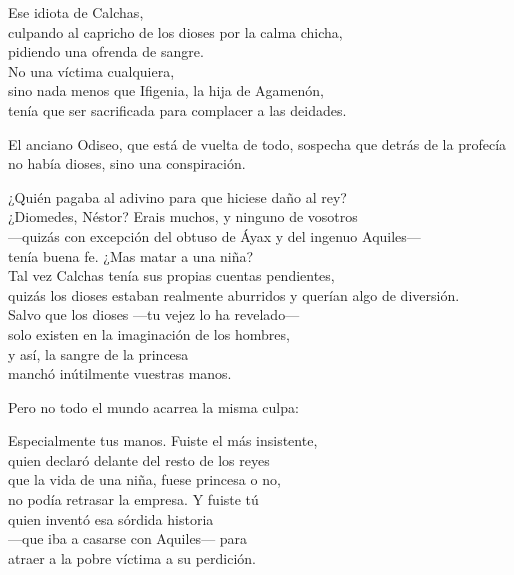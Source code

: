 \begin{versopropio}
Ese idiota de Calchas,\\
culpando al capricho de los dioses por la calma chicha,\\
pidiendo una ofrenda de sangre.\\
No una víctima cualquiera,\\
sino nada menos que Ifigenia, la hija de Agamenón,\\
tenía que ser sacrificada para complacer a las deidades.
\end{versopropio}

El anciano Odiseo, que está de vuelta de todo, sospecha que detrás de la profecía no había dioses, sino una conspiración.

\begin{versopropio}
¿Quién pagaba al adivino para que hiciese daño al rey?\\
¿Diomedes, Néstor? Erais muchos, y ninguno de vosotros\\
---quizás con excepción del obtuso de Áyax y del ingenuo Aquiles---\\
tenía buena fe. ¿Mas matar a una niña?\\
Tal vez Calchas tenía sus propias cuentas pendientes,\\
quizás los dioses estaban realmente aburridos y querían algo de diversión.\\
Salvo que los dioses ---tu vejez lo ha revelado---\\
solo existen en la imaginación de los hombres,\\
y así, la sangre de la princesa\\
manchó inútilmente vuestras manos.
\end{versopropio}

Pero no todo el mundo acarrea la misma culpa:

\begin{versopropio}
Especialmente tus manos. Fuiste el más insistente,\\
quien declaró delante del resto de los reyes\\
que la vida de una niña, fuese princesa o no,\\
no podía retrasar la empresa. Y fuiste tú\\
quien inventó esa sórdida historia\\
---que iba a casarse con Aquiles--- para\\
atraer a la pobre víctima a su perdición.
\end{versopropio}

